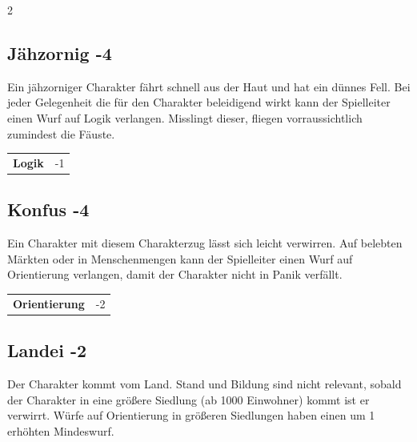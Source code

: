 \begin{multicols}{2}
\begin{tcolorbox}
\end{tcolorbox}

\begin{tcolorbox}
    \subsection*{Jähzornig \hfill \small{-4 }}
    \tcblower
Ein jähzorniger Charakter fährt schnell aus der Haut und hat ein dünnes Fell. Bei jeder Gelegenheit die für den Charakter beleidigend wirkt kann der Spielleiter einen Wurf auf Logik verlangen. Misslingt dieser, fliegen vorraussichtlich zumindest die Fäuste.


\vspace{3mm}

\begin{tabular}{@{}ll@{}}
    \textbf{Logik} & -1\\
\end{tabular}


\end{tcolorbox}

\begin{tcolorbox}
    \subsection*{Konfus \hfill \small{-4 }}
    \tcblower
Ein Charakter mit diesem Charakterzug lässt sich leicht verwirren. Auf belebten Märkten oder in Menschenmengen kann der Spielleiter einen Wurf auf Orientierung verlangen, damit der Charakter nicht in Panik verfällt.


\vspace{3mm}

\begin{tabular}{@{}ll@{}}
    \textbf{Orientierung} & -2\\
\end{tabular}


\end{tcolorbox}

\begin{tcolorbox}
    \subsection*{Landei \hfill \small{-2 }}
    \tcblower
Der Charakter kommt vom Land. Stand und Bildung sind nicht relevant, sobald der Charakter in eine größere Siedlung (ab 1000 Einwohner) kommt ist er verwirrt. Würfe auf Orientierung in größeren Siedlungen haben einen um 1 erhöhten Mindeswurf.



\end{tcolorbox}
\end{multicols}
